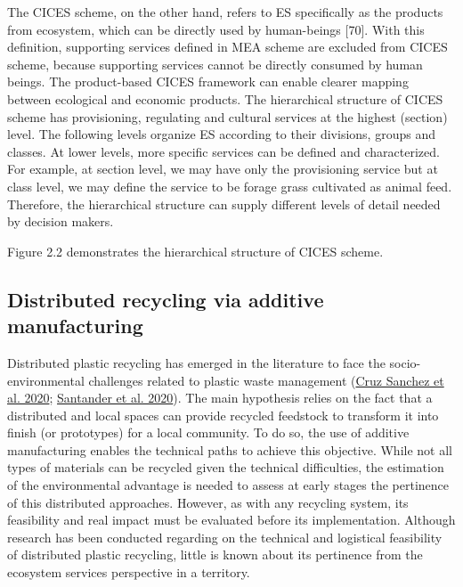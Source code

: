 \documentclass[
]{article}
\begin{document}
The CICES scheme, on the other hand, refers to ES specifically as the products from ecosystem, which can be directly used by human-beings {[}70{]}.
With this definition, supporting services defined in MEA scheme are excluded from CICES scheme, because supporting services cannot be directly consumed by human beings.
The product-based CICES framework can enable clearer mapping between ecological and economic products.
The hierarchical structure of CICES scheme has provisioning, regulating and cultural services at the highest (section) level.
The following levels organize ES according to their divisions, groups and classes.
At lower levels, more specific services can be defined and characterized.
For example, at section level, we may have only the provisioning service but at class level, we may define the service to be forage grass cultivated as animal feed.
Therefore, the hierarchical structure can supply different levels of detail needed by decision makers.

Figure 2.2 demonstrates the hierarchical structure of CICES scheme.

\hypertarget{distributed-recycling-via-additive-manufacturing}{%
\subsection{Distributed recycling via additive manufacturing}\label{distributed-recycling-via-additive-manufacturing}}

Distributed plastic recycling has emerged in the literature to face the socio-environmental challenges related to plastic waste management (\protect\hyperlink{ref-CruzSanchez2020}{Cruz Sanchez et al. 2020}; \protect\hyperlink{ref-Santander2020}{Santander et al. 2020}).
The main hypothesis relies on the fact that a distributed and local spaces can provide recycled feedstock to transform it into finish (or prototypes) for a local community.
To do so, the use of additive manufacturing enables the technical paths to achieve this objective.
While not all types of materials can be recycled given the technical difficulties, the estimation of the environmental advantage is needed to assess at early stages the pertinence of this distributed approaches.
However, as with any recycling system, its feasibility and real impact must be evaluated before its implementation.
Although research has been conducted regarding on the technical and logistical feasibility of distributed plastic recycling, little is known about its pertinence from the ecosystem services perspective in a territory.
\end{document}

